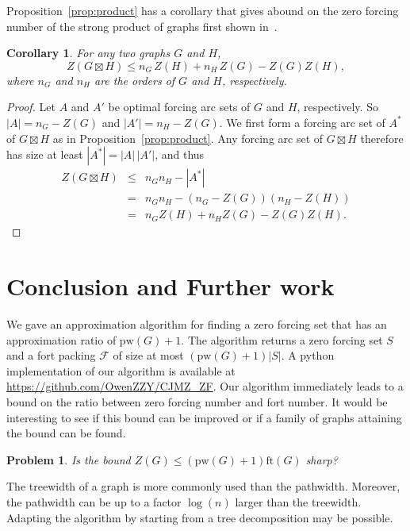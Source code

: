\documentclass[12pt]{amsart}
\theoremstyle{plain}
\newtheorem{corollary}[theorem]{Corollary}
\newtheorem{problem}[theorem]{Problem}
\theoremstyle{definition}
\def\F{\mathcal F}
\def\ft{\mathrm{ft}}
\def\pw{\mathrm{pw}}
\begin{document}
Proposition~\ref{prop:product} has a corollary that gives abound on the zero forcing number of the strong product of graphs first shown in~\cite{Huang2010}. 

\begin{corollary}
For any two graphs $G$ and $H$,   
\begin{equation*}
  Z(G\boxtimes H)\leq  n_G\,Z(H)+ n_H\, Z(G)-Z(G)Z(H),   
\end{equation*}
where $n_G$ and $n_H$ are the orders of $G$ and $H$, respectively.
\end{corollary}
\begin{proof} Let $A$ and $A'$ be optimal forcing arc sets of $G$ and $H$, respectively. So $|A|=n_G-Z(G)$ and $|A'|=n_H-Z(G)$. 
We first form a forcing arc set of $A^*$ of $G\boxtimes H$ as in Proposition~\ref{prop:product}.
Any forcing arc set of $G\boxtimes H$ therefore has size at least $|A^*|=|A|\,|A'|$, and thus
\begin{eqnarray*}
Z(G\boxtimes H)&\leq &n_Gn_H-|A^*|\\
 &=& n_Gn_H-(n_G-Z(G))(n_H-Z(H))\\
 &=& n_GZ(H) + n_HZ(G)-Z(G)Z(H).
 \end{eqnarray*}
\end{proof}

\section{Conclusion and Further work}\label{sec:conclusion}

We gave an approximation algorithm for finding a zero forcing set that has an approximation ratio of $\pw(G)+1$. The algorithm returns a zero forcing set $S$ and a fort packing $\F$ of size at most $(\pw(G)+1)|S|$. A python implementation of our algorithm is available at \url{https://github.com/OwenZZY/CJMZ_ZF}. Our algorithm immediately leads to a bound on the ratio between zero forcing number and fort number. It would be interesting to see if this bound can be improved or if a family of graphs attaining the bound can be found.

\begin{problem}
    Is the bound $Z(G)\leq (\pw(G)+1)\ft(G)$ sharp?
\end{problem}

The treewidth of a graph is more commonly used than the pathwidth. Moreover, the pathwidth can be up to a factor $\log(n)$ larger than the treewidth. Adapting the algorithm by starting from a tree decomposition may be possible. 
\end{document}
